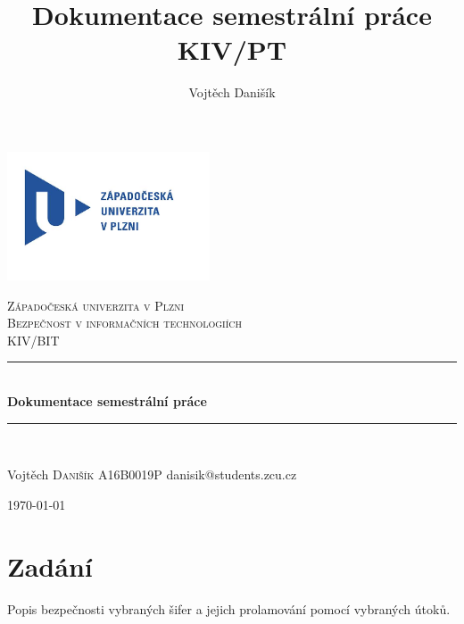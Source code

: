 \documentclass[12pt, a4paper]{article}
\title{\textbf{Dokumentace semestrální práce} \\KIV/PT}
\author{Vojtěch Danišík}
\begin{document}
\begin{titlepage} 
	\newcommand{\HRule}{\rule{\linewidth}{0.5mm}} 
	\begin{center}
	\includegraphics[width=6cm]{img/logo}\\
	\end{center}
	\textsc{\LARGE Západočeská univerzita v Plzni}\\[1.5cm] 	
	\textsc{\Large Bezpečnost v informačních technologiích}\\[0.5cm] 
	\textsc{\large KIV/BIT}\\[0.5cm] 
	\HRule\\[0.4cm]
	{\huge\bfseries Dokumentace semestrální práce}\\[0.4cm] 
	\HRule\\[1.5cm]

	\begin{minipage}{0.4\textwidth}
		\begin{flushleft}
			\large
			Vojtěch \textsc{Danišík}\newline
			A16B0019P\newline
			danisik@students.zcu.cz
		\end{flushleft}
	\end{minipage}
	\vfill\vfill\vfill
	\begin{flushright}
	{\large\today}
	\end{flushright}
	\vfill 
\end{titlepage}
\newpage
\tableofcontents
\newpage
\section{Zadání}
Popis bezpečnosti vybraných šifer a jejich prolamování pomocí vybraných útoků.
\end{document}
